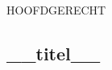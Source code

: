 \newpage

\begin{center}
    \uppercase{Hoofdgerecht}
    \subsection{__titel__}

    
\end{center}

\vspace{0.5cm}

